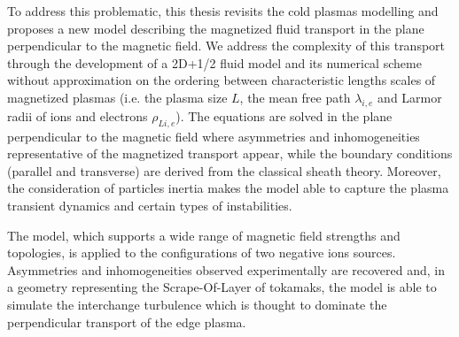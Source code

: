 To address this problematic, this thesis revisits the cold plasmas modelling
and proposes a new model describing the magnetized fluid transport
in the plane perpendicular to the magnetic field.
We address the complexity of this transport through the development of a 2D+1/2
fluid model and its numerical scheme without approximation on the ordering
between characteristic lengths scales of magnetized plasmas (i.e. the plasma
size $L$, the mean free path $\lambda_{i,e}$ and Larmor radii of ions and
electrons $\rho_{Li,e}$).
The equations are solved in the plane perpendicular to the magnetic field where
asymmetries and inhomogeneities representative of the magnetized transport
appear, while the boundary conditions (parallel and transverse) are derived
from the classical sheath theory. Moreover, the consideration of particles
inertia makes the model able to capture the plasma transient dynamics and
certain types of instabilities.
	
The model, which supports a wide range of magnetic field strengths and
topologies, is applied to the configurations of two negative ions sources. 
Asymmetries and inhomogeneities observed experimentally are recovered and, in a
geometry representing the Scrape-Of-Layer of tokamaks, the model is able to
simulate the interchange turbulence which is thought to dominate the
perpendicular transport of the edge plasma.
		  
		
